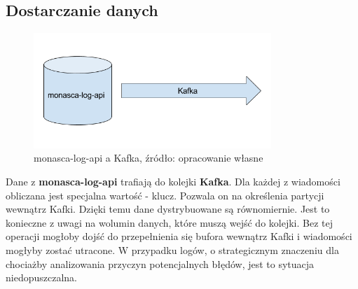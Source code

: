     \subsection{Dostarczanie danych}
    \begin{figure}[H]
        \centering
        \includegraphics[width=0.80\textwidth]{images/monasca_log_api_to_kafka}
        \caption[monasca-log-api a Kafka]{
            monasca-log-api a Kafka, źródło: opracowanie własne
        }
        \label{chapter:monasca:monasca_log_api:kafka}
    \end{figure}
    Dane z \textbf{monasca-log-api} trafiają do kolejki \textbf{Kafka}.
    Dla każdej z wiadomości obliczana jest specjalna wartość - klucz. Pozwala on na określenia partycji
    wewnątrz Kafki. Dzięki temu dane dystrybuowane są równomiernie. Jest to konieczne z uwagi
    na wolumin danych, które muszą wejść do kolejki. Bez tej operacji mogłoby dojść do przepełnienia się
    bufora wewnątrz Kafki i wiadomości mogłyby zostać utracone. W przypadku logów, o strategicznym
    znaczeniu dla chociażby analizowania przyczyn potencjalnych błędów, jest to sytuacja niedopuszczalna.
    